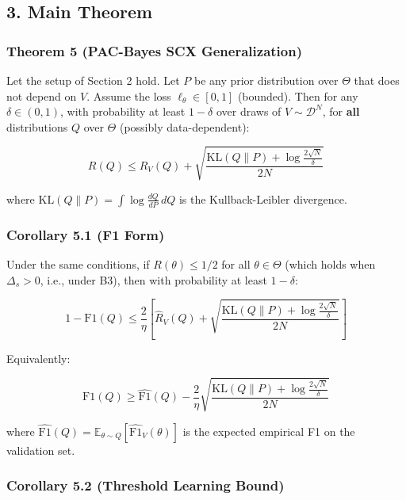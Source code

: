 \documentclass[
  12pt,
]{ctexart}
\begin{document}
\subsection{3. Main Theorem}\label{main-theorem}

\subsubsection{Theorem 5 (PAC-Bayes SCX
Generalization)}\label{theorem-5-pac-bayes-scx-generalization}

Let the setup of Section 2 hold. Let \(P\) be any prior distribution
over \(\Theta\) that does not depend on \(V\). Assume the loss
\(\ell_\theta \in [0,1]\) (bounded). Then for any \(\delta \in (0,1)\),
with probability at least \(1-\delta\) over draws of
\(V \sim \mathcal{D}^N\), for \textbf{all} distributions \(Q\) over
\(\Theta\) (possibly data-dependent):

\[R(Q) \leq \hat{R}_V(Q) + \sqrt{\frac{\text{KL}(Q \parallel P) + \log\frac{2\sqrt{N}}{\delta}}{2N}}\]

where \(\text{KL}(Q \parallel P) = \int \log\frac{dQ}{dP}\, dQ\) is the
Kullback-Leibler divergence.

\subsubsection{Corollary 5.1 (F1 Form)}\label{corollary-5.1-f1-form}

Under the same conditions, if \(R(\theta) \leq 1/2\) for all
\(\theta \in \Theta\) (which holds when \(\Delta_s > 0\), i.e., under
B3), then with probability at least \(1-\delta\):

\[1 - \text{F1}(Q) \leq \frac{2}{\eta}\left[\hat{R}_V(Q) + \sqrt{\frac{\text{KL}(Q \parallel P) + \log\frac{2\sqrt{N}}{\delta}}{2N}}\right]\]

Equivalently:

\[\text{F1}(Q) \geq \widehat{\text{F1}}(Q) - \frac{2}{\eta}\sqrt{\frac{\text{KL}(Q \parallel P) + \log\frac{2\sqrt{N}}{\delta}}{2N}}\]

where
\(\widehat{\text{F1}}(Q) = \mathbb{E}_{\theta\sim Q}[\widehat{\text{F1}}_V(\theta)]\)
is the expected empirical F1 on the validation set.

\subsubsection{Corollary 5.2 (Threshold Learning
Bound)}\label{corollary-5.2-threshold-learning-bound}
\end{document}
